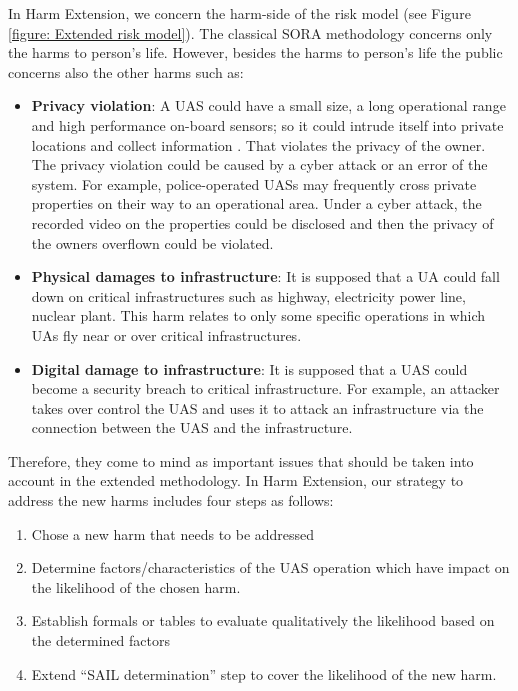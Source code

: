 \documentclass[a4paper, 10, conference]{ieeeconf}  %
\begin{document}
In Harm Extension, we concern the harm-side of the risk model (see Figure \ref{figure: Extended risk model}). The classical SORA methodology concerns only the harms to person's life. However, besides the harms to person's life the public concerns also the other harms \cite{A-NPA2015, SORAV1,EASA_SORA,7383633} such as:  
\begin{itemize}
    \item \textbf{Privacy violation}: A UAS could have a small size, a long operational range and high performance on-board sensors; so it could intrude itself into private locations and collect information \cite{8490190}. That violates the privacy of the owner.  The privacy violation could be caused by a cyber attack or an error of the system. For example, police-operated UASs may frequently cross private properties on their way to an operational area. Under a cyber attack, the recorded video on the properties could be disclosed and then the privacy of the owners overflown could be violated.  
    
    \item \textbf{Physical damages to infrastructure}: It is supposed that a UA could fall down on critical infrastructures such as highway, electricity power line, nuclear plant. This harm relates to only some specific operations in which UAs fly near or over critical infrastructures.
    
    \item \textbf{Digital damage to infrastructure}: It is supposed that a UAS could become a security breach to critical infrastructure. For example, an attacker takes over control the UAS and uses it to attack an infrastructure via the connection between the UAS and the infrastructure.   
    
    
\end{itemize}
Therefore, they come to mind as important issues that should be taken into account in the extended methodology. In Harm Extension, our strategy to address the new harms includes four steps as follows:
\begin{enumerate}
	\item Chose a new harm that needs to be addressed
	\item Determine factors/characteristics of the UAS operation which have impact on the likelihood of the chosen harm.
	\item Establish formals or tables to evaluate qualitatively the likelihood based on the determined factors
	\item Extend ``SAIL determination'' step to cover the likelihood of the new harm. 
\end{enumerate}
\end{document}
